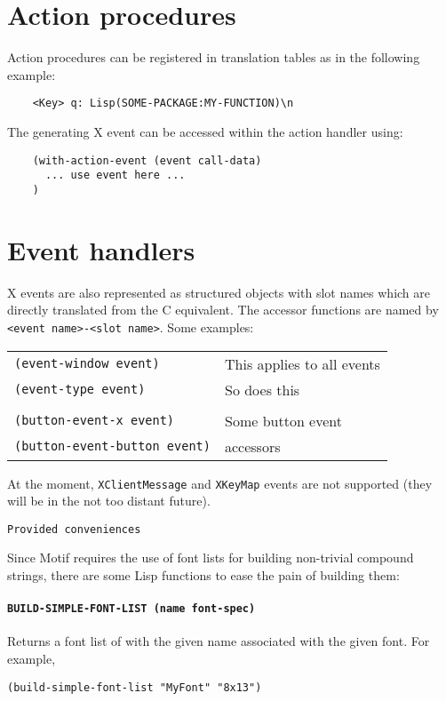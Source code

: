 \documentclass{article}
\newcommand{\functdescr}[1]{\paragraph{\texttt{#1}}}
\begin{document}
\section{Action procedures}

Action procedures can be registered in translation tables as in the
following example:

\begin{verbatim}
	<Key> q: Lisp(SOME-PACKAGE:MY-FUNCTION)\n
\end{verbatim}

\noindent
The generating X event can be accessed within the action handler
using:

\begin{verbatim}
	(with-action-event (event call-data)
	  ... use event here ...
	)
\end{verbatim}


\section{Event handlers}

X events are also represented as structured objects with slot names
which are directly translated from the C equivalent.  The accessor
functions are named by \texttt{<event name>-<slot name>}.  Some
examples:\\[2mm]
\begin{tabular}{ll}
\texttt{(event-window event)}  & This applies to all events\\
\texttt{(event-type event)}    & So does this\\
 & \\
\texttt{(button-event-x event)}      & Some button event\\
\texttt{(button-event-button event)} & accessors\\
\end{tabular}

At the moment, \texttt{XClientMessage} and \texttt{XKeyMap} events are
not supported (they will be in the not too distant future).


\texttt{Provided conveniences}

Since Motif requires the use of font lists for building non-trivial
compound strings, there are some Lisp functions to ease the pain of
building them:

\functdescr{BUILD-SIMPLE-FONT-LIST (name font-spec)} Returns a font
list of with the given name associated with the given font.  For
example,

\begin{verbatim}
(build-simple-font-list "MyFont" "8x13")
\end{verbatim}
\end{document}
